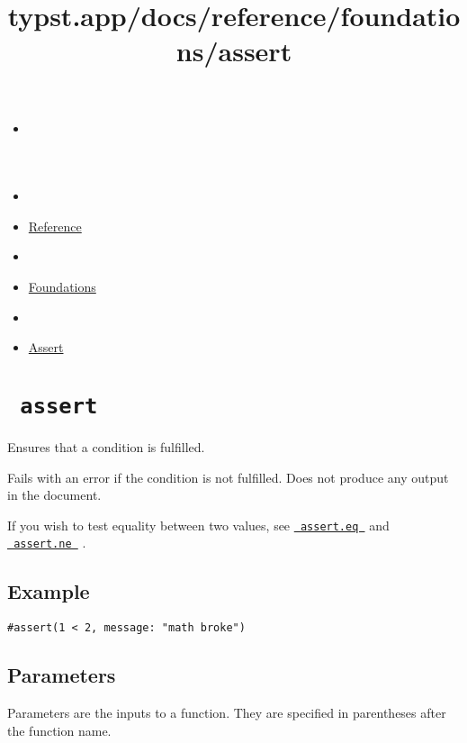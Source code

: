 \title{typst.app/docs/reference/foundations/assert}

\begin{itemize}
\tightlist
\item
  \href{/docs}{}
\item
  
\item
  \href{/docs/reference/}{Reference}
\item
  
\item
  \href{/docs/reference/foundations/}{Foundations}
\item
  
\item
  \href{/docs/reference/foundations/assert/}{Assert}
\end{itemize}

\section{\texorpdfstring{\texttt{\ assert\ }}{ assert }}\label{summary}

Ensures that a condition is fulfilled.

Fails with an error if the condition is not fulfilled. Does not produce
any output in the document.

If you wish to test equality between two values, see
\href{/docs/reference/foundations/assert/\#definitions-eq}{\texttt{\ assert.eq\ }}
and
\href{/docs/reference/foundations/assert/\#definitions-ne}{\texttt{\ assert.ne\ }}
.

\subsection{Example}\label{example}

\begin{verbatim}
#assert(1 < 2, message: "math broke")
\end{verbatim}

\subsection{\texorpdfstring{{ Parameters
}}{ Parameters }}\label{parameters}

\label{parameters-tooltip}
Parameters are the inputs to a function. They are specified in
parentheses after the function name.

